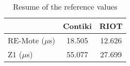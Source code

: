 \begin{table}[!ht]
  \centering
  \begin{tabular}{l|c|c}
                   & Contiki  & RIOT    \\ \hline
  RE-Mote ($\mu$s) & 18.505  & 12.626   \\
  Z1 ($\mu$s)      & 55.077   & 27.699
  \end{tabular}
  \caption{Resume of the reference values}
  \label{tab:reference-values-resume}
  \end{table}